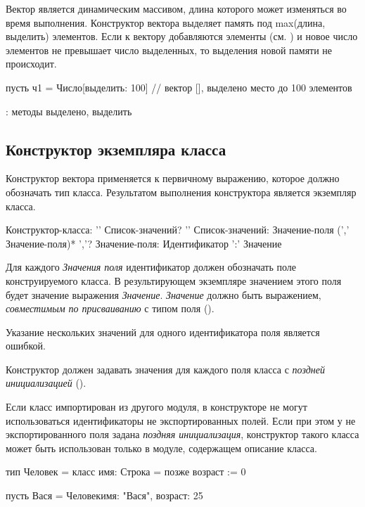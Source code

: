 Вектор является динамическим массивом, длина которого может изменяться во время выполнения. Конструктор вектора выделяет память под max(длина, выделить) элементов. 
Если к вектору добавляются элементы (см. ) и новое число элементов не превышает число выделенных, то выделения новой памяти не происходит. 

\begin{Trivil}
пусть ч1 = Число[выделить: 100] 
// вектор [], выделено место до 100 элементов
\end{Trivil}

\TBD: методы выделено, выделить

\hypertarget{class-composite}{%
\subsection{Конструктор экземпляра класса}\label{expr:class-composite}}

Конструктор вектора применяется к первичному выражению, которое должно обозначать тип класса. 
Результатом выполнения конструктора является экземпляр класса.

\begin{Grammar}
Конструктор-класса: '{' Список-значений? '}' 
Список-значений: Значение-поля (',' Значение-поля)* ','?
Значение-поля: Идентификатор ':' Значение
\end{Grammar}   

Для каждого \emph{Значения поля} идентификатор должен обозначать поле конструируемого класса. 
В результирующем экземпляре значением этого поля будет значение выражения \emph{Значение}.    
\emph{Значение} должно быть выражением, \emph{совместимым по присваиванию} с типом поля ().

Указание нескольких значений для одного идентификатора поля является ошибкой.

Конструктор должен задавать значения для каждого поля класса с \emph{поздней инициализацией} ().

Если класс импортирован из другого модуля, в конструкторе не могут использоваться идентификаторы не экспортированных полей. 
Если при этом у не экспортированного поля задана \emph{поздняя инициализация}, конструктор такого класса может быть использован только в модуле,
содержащем описание класса.

\begin{Trivil}[vspace=2pt]
тип Человек = класс {
    имя: Строка = позже
    возраст := 0
}

пусть Вася = Человек{имя: "Вася", возраст: 25}
\end{Trivil}

